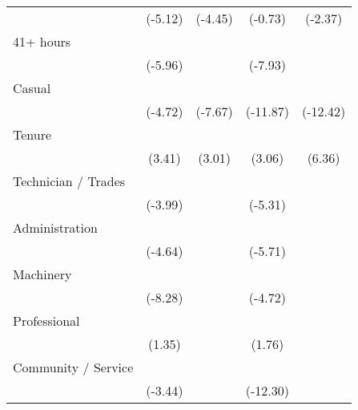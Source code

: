 {\begin{tabular}{l*{4}{c}}
                    &     (-5.12)         &     (-4.45)         &     (-0.73)         &     (-2.37)         \\
[1em]
41+ hours           &            \sym{***}&                     &            \sym{***}&                     \\
                    &     (-5.96)         &                     &     (-7.93)         &                     \\
[1em]
Casual              &            \sym{***}&            \sym{***}&            \sym{***}&            \sym{***}\\
                    &     (-4.72)         &     (-7.67)         &    (-11.87)         &    (-12.42)         \\
[1em]
Tenure              &            \sym{***}&            \sym{**} &            \sym{**} &            \sym{***}\\
                    &      (3.41)         &      (3.01)         &      (3.06)         &      (6.36)         \\
[1em]
Technician / Trades &            \sym{***}&                     &            \sym{***}&                     \\
                    &     (-3.99)         &                     &     (-5.31)         &                     \\
[1em]
Administration      &            \sym{***}&                     &            \sym{***}&                     \\
                    &     (-4.64)         &                     &     (-5.71)         &                     \\
[1em]
Machinery           &            \sym{***}&                     &            \sym{***}&                     \\
                    &     (-8.28)         &                     &     (-4.72)         &                     \\
[1em]
Professional        &                     &                     &                     &                     \\
                    &      (1.35)         &                     &      (1.76)         &                     \\
[1em]
Community / Service &            \sym{***}&                     &            \sym{***}&                     \\
                    &     (-3.44)         &                     &    (-12.30)         &                     \\

\end{tabular}}
